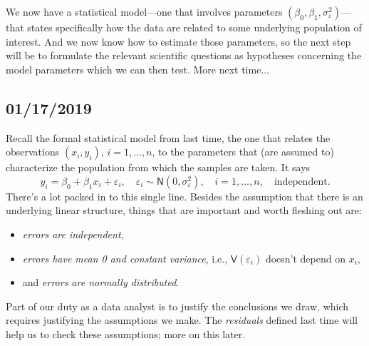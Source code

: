 \documentclass[a4paper, 12pt]{article}
\theoremstyle{plain}
\theoremstyle{definition}
\theoremstyle{remark}
\newcommand{\var}{\mathsf{V}}
\newcommand{\eps}{\varepsilon}
\newcommand{\nm}{\mathsf{N}}
\begin{document}
We now have a statistical model---one that involves parameters $(\beta_0, \beta_1, \sigma_\eps^2)$---that states specifically how the data are related to some underlying population of interest.  And we now know how to estimate those parameters, so the next step will be to formulate the relevant scientific questions as hypotheses concerning the model parameters which we can then test.  More next time...


\subsection*{01/17/2019}

Recall the formal statistical model from last time, the one that relates the observations $(x_i, y_i)$, $i=1,\ldots,n$, to the parameters that (are assumed to) characterize the population from which the samples are taken.  It says 
\[ y_i = \beta_0 + \beta_1 x_i + \eps_i, \quad \eps_i \sim \nm(0, \sigma_\eps^2), \quad i=1,\ldots,n, \quad \text{independent}. \]
There's a lot packed in to this single line.  Besides the assumption that there is an underlying linear structure, things that are important and worth fleshing out are:
\begin{itemize}
\item {\em errors are independent},
\vspace{-2mm} 
\item {\em errors have mean 0 and constant variance}, i.e., $\var(\eps_i)$ doesn't depend on $x_i$,
\vspace{-2mm}
\item and {\em errors are normally distributed}.  
\end{itemize}
Part of our duty as a data analyst is to justify the conclusions we draw, which requires justifying the assumptions we make.  The {\em residuals} defined last time will help us to check these assumptions; more on this later.
\end{document}
